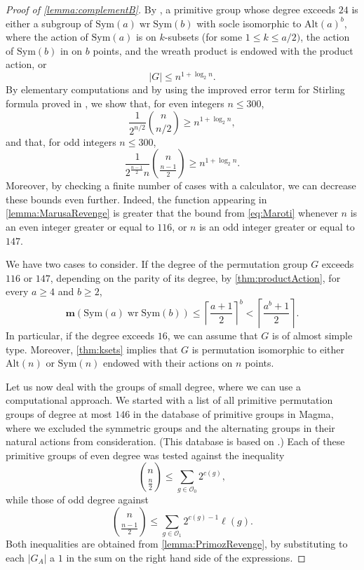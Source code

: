 \documentclass[a4paper]{amsart}
\newcommand{\Sym}{\mathrm{Sym}}
\newcommand{\Alt}{\mathrm{Alt}}
\renewcommand{\wr}{\mathop{\mathrm{wr}}}
\newcommand{\m}{\mathbf{m}}
\theoremstyle{definition}
\begin{document}
\begin{proof}[Proof of \cref{lemma:complementB}]
By \cite[Theorem~1.1]{Maroti2002}, a primitive group whose degree exceeds $24$ is either a subgroup of $\Sym(a) \wr \Sym(b)$ with socle isomorphic to $\Alt(a)^b$, where the action of $\Sym(a)$ is on $k$-subsets (for some $1\le k \le a/2)$, the action of $\Sym(b)$ in on $b$ points, and the wreath product is endowed with the product action, or
\begin{equation}\label{eq:Maroti}
    |G| \leq n^{1 + \log_2n}.
\end{equation}
By elementary computations and by using the improved error term for Stirling formula proved in \cite{Robbins1995}, we show that, for even integers $n\le 300$,
\[ \frac{1}{2^{n/2}} {n \choose n/2} \ge n^{1 + \log_2n} ,\]
and that, for odd integers $n\le 300$,
\[\frac{1}{2^{\frac{n-1}{2}}n} {n \choose \frac{n-1}{2}} \ge n^{1 + \log_2n}.\]
Moreover, by checking a finite number of cases with a calculator, we can decrease these bounds even further. Indeed, the function appearing in \cref{lemma:MarusaRevenge} is greater that the bound from \cref{eq:Maroti} whenever $n$ is an even integer greater or equal to $116$, or $n$ is an odd integer greater or equal to $147$. 

We have two cases to consider. If the degree of the permutation group $G$ exceeds $116$ or $147$, depending on the parity of its degree, by \cref{thm:productAction}, for every $a \geq 4$ and $b\geq 2$,
\[ \m(\Sym(a) \wr \Sym(b)) \leq \left\lceil \frac{a+1}{2} \right\rceil^b < \left\lceil \frac{a^b+1}{2} \right\rceil.\]
In particular, if the degree exceeds $16$, we can assume that  $G$ is of almost simple type. Moreover, \cref{thm:ksets} implies that $G$ is permutation isomorphic to either $\Alt(n)$ or $\Sym(n)$ endowed with their actions on $n$ points.

Let us now deal with the groups of small degree, where we can use a computational approach. We started with a list of all primitive permutation groups of degree at most $146$ in the database of primitive groups in {\sc Magma}, where we excluded the symmetric groups and the alternating groups in their natural actions from consideration. (This database is based on \cite{CouttsQuickRD11,RD05,RDunger03,Sims70}.) Each of these primitive groups of even degree was tested against the inequality 
\[{n \choose \frac{n}{2}} \le \sum_{g\in \mathcal{O}_0} 2^{c(g)} ,\]
while those of odd degree against
\[{n \choose\frac{n-1}{2}} \le \sum_{g\in \mathcal{O}_1} 2^{c(g)-1} \ell(g) .\]
Both inequalities are obtained from \cref{lemma:PrimozRevenge}, by substituting to each $|G_A|$ a $1$ in the sum on the right hand side of the expressions.


\end{proof}
\end{document}
